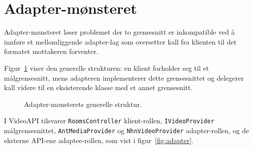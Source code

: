 \section{Adapter-mønsteret}
\label{sec:adapter-monsteret}

Adapter-mønsteret \cite{gamma1994} løser problemet der to grensesnitt er inkompatible ved å innføre et mellomliggende adapter-lag som oversetter kall fra klienten til det formatet mottakeren forventer.

Figur~\ref{fig:adapter-general} viser den generelle strukturen: en klient forholder seg til et målgrensesnitt, mens adapteren implementerer dette grensesnittet og delegerer kall videre til en eksisterende klasse med et annet grensesnitt.

\begin{figure}[H]
\centering
{}
\caption{Adapter-mønsterets generelle struktur.}
\label{fig:adapter-general}
\end{figure}

I VideoAPI tilsvarer \texttt{RoomsController} klient-rollen,
\texttt{IVideoProvider} målgrensesnittet, \texttt{AntMediaProvider} og
\texttt{NhnVideoProvider} adapter-rollen, og de eksterne API-ene
adaptee-rollen, som vist i figur~\ref{fig:adapter}.


